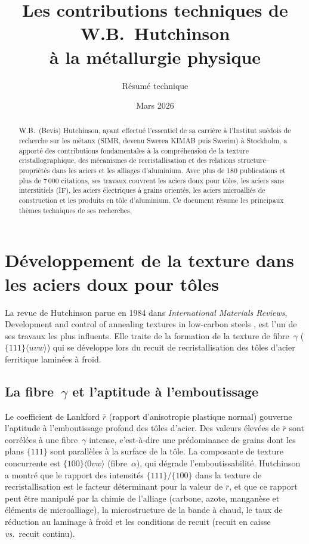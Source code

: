 \documentclass[11pt,a4paper]{article}
\title{Les contributions techniques de W.B.\ Hutchinson \\
       \`a la m\'etallurgie physique}
\author{R\'esum\'e technique}
\date{Mars 2026}
\begin{document}
\maketitle

\begin{abstract}
W.B.\ (Bevis) Hutchinson, ayant effectu\'e l'essentiel de sa carri\`ere
\`a l'Institut su\'edois de recherche sur les m\'etaux (SIMR, devenu
Swerea KIMAB puis Swerim) \`a Stockholm, a apport\'e des contributions
fondamentales \`a la compr\'ehension de la texture cristallographique,
des m\'ecanismes de recristallisation et des relations
structure--propri\'et\'es dans les aciers et les alliages d'aluminium.
Avec plus de 180 publications et plus de 7\,000 citations, ses travaux
couvrent les aciers doux pour t\^oles, les aciers sans interstitiels
(IF), les aciers \'electriques \`a grains orient\'es, les aciers
microalli\'es de construction et les produits en t\^ole d'aluminium.  Ce
document r\'esume les principaux th\`emes techniques de ses recherches.
\end{abstract}

\section{D\'eveloppement de la texture dans les aciers doux pour t\^oles}
\label{sec:bcc-texture}

La revue de Hutchinson parue en 1984 dans \emph{International Materials
Reviews}, \og Development and control of annealing textures in low-carbon
steels \fg{} \cite{Hutchinson1984IMR}, est l'un de ses travaux les plus
influents.  Elle traite de la formation de la texture de fibre~$\gamma$
($\{111\}\langle uvw\rangle$) qui se d\'eveloppe lors du recuit de
recristallisation des t\^oles d'acier ferritique lamin\'ees \`a froid.

\subsection{La fibre~$\gamma$ et l'aptitude \`a l'emboutissage}

Le coefficient de Lankford $\bar{r}$ (rapport d'anisotropie plastique
normal) gouverne l'aptitude \`a l'emboutissage profond des t\^oles
d'acier.  Des valeurs \'elev\'ees de $\bar{r}$ sont corr\'el\'ees
\`a une fibre~$\gamma$ intense, c'est-\`a-dire une pr\'edominance de
grains dont les plans $\{111\}$ sont parall\`eles \`a la surface de la
t\^ole.  La composante de texture concurrente est
$\{100\}\langle 0vw\rangle$ (fibre~$\alpha$), qui d\'egrade
l'emboutissabilit\'e.  Hutchinson a montr\'e que le rapport des
intensit\'es $\{111\}$/$\{100\}$ dans la texture de recristallisation
est le facteur d\'eterminant pour la valeur de $\bar{r}$, et que ce
rapport peut \^etre manipul\'e par la chimie de l'alliage (carbone,
azote, mangan\`ese et \'el\'ements de microalliage), la microstructure
de la bande \`a chaud, le taux de r\'eduction au laminage \`a froid et
les conditions de recuit (recuit en caisse \emph{vs.}\ recuit continu).
\end{document}
